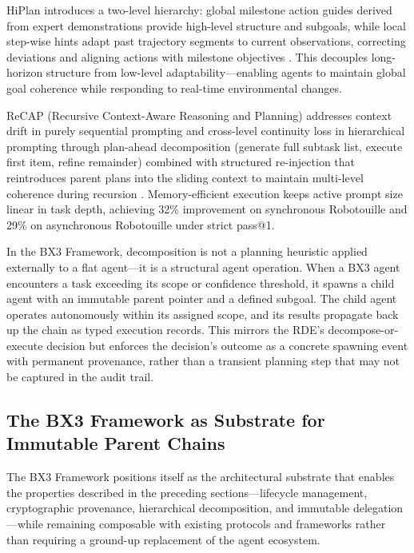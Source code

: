 HiPlan introduces a two-level hierarchy: global milestone action guides derived from expert demonstrations provide high-level structure and subgoals, while local step-wise hints adapt past trajectory segments to current observations, correcting deviations and aligning actions with milestone objectives \cite{hiplan2025}. This decouples long-horizon structure from low-level adaptability---enabling agents to maintain global goal coherence while responding to real-time environmental changes.

ReCAP (Recursive Context-Aware Reasoning and Planning) addresses context drift in purely sequential prompting and cross-level continuity loss in hierarchical prompting through plan-ahead decomposition (generate full subtask list, execute first item, refine remainder) combined with structured re-injection that reintroduces parent plans into the sliding context to maintain multi-level coherence during recursion \cite{recap2025}. Memory-efficient execution keeps active prompt size linear in task depth, achieving 32\% improvement on synchronous Robotouille and 29\% on asynchronous Robotouille under strict pass@1.

In the BX3 Framework, decomposition is not a planning heuristic applied externally to a flat agent---it is a structural agent operation. When a BX3 agent encounters a task exceeding its scope or confidence threshold, it spawns a child agent with an immutable parent pointer and a defined subgoal. The child agent operates autonomously within its assigned scope, and its results propagate back up the chain as typed execution records. This mirrors the RDE's decompose-or-execute decision \cite{rde2024} but enforces the decision's outcome as a concrete spawning event with permanent provenance, rather than a transient planning step that may not be captured in the audit trail.

\subsection{The BX3 Framework as Substrate for Immutable Parent Chains}

The BX3 Framework positions itself as the architectural substrate that enables the properties described in the preceding sections---lifecycle management, cryptographic provenance, hierarchical decomposition, and immutable delegation---while remaining composable with existing protocols and frameworks rather than requiring a ground-up replacement of the agent ecosystem.

